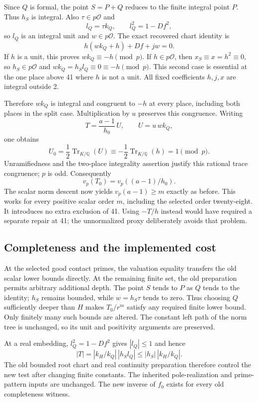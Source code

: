 Since $Q$ is formal, the point $S=P+Q$ reduces to the finite integral
point $P$. Thus $h_S$ is integral. Also $\tau\in p\mathcal O$ and
\[
 l_Q=\tau k_Q,\qquad l_Q^2=1-Df^2,
\]
so $l_Q$ is an integral unit and $w\in p\mathcal O$.
The exact recovered chart identity is
\[
 h(wk_Q+h)+Df+jw=0.                         \tag{*}
\]
If $h$ is a unit, this proves $wk_Q\equiv-h\pmod p$.
If $h\in p\mathcal O$, then $x_S\equiv x=h^2\equiv0$, so
$h_S\in p\mathcal O$ and
$wk_Q=h_Sl_Q\equiv0\equiv-h\pmod p$.
This second case is essential at the one place above 41 where $h$ is
not a unit. All fixed coefficients $h,j,x$ are integral outside 2.

Therefore $wk_Q$ is integral and congruent to $-h$ at every place,
including both places in the split case. Multiplication by $u$ preserves
this congruence. Writing
\[
 T=\frac{a-1}{h_0}\,U,\qquad U=u\,wk_Q,
\]
one obtains
\[
 U_0=\frac12\operatorname{Tr}_{K/\mathbb Q}(U)
       \equiv-\frac12\operatorname{Tr}_{K/\mathbb Q}(h)
       =1\pmod p.
\]
Unramifiedness and the two-place integrality assertion justify this
rational trace congruence; $p$ is odd. Consequently
\[
 \boxed{\ v_p(T_0)=v_p((a-1)/h_0).\ }
\]
The scalar norm descent now yields $v_p(a-1)\ge m$ exactly as before.
This works for every positive scalar order $m$, including the selected
order twenty-eight. It introduces no extra exclusion of 41.
Using $-T/h$ instead would have required a separate repair at 41;
the unnormalized proxy deliberately avoids that problem.

\subsection{Completeness and the implemented cost}

At the selected good contact primes, the valuation equality transfers
the old scalar lower bounds directly. At the remaining finite set, the
old preparation permits arbitrary additional depth. The point $S$ tends
to $P$ as $Q$ tends to the identity; $h_S$ remains bounded, while
$w=h_S\tau$ tends to zero. Thus choosing $Q$ sufficiently deeper than
$H$ makes $T_0/r^m$ satisfy any required finite lower bound. Only finitely
many such bounds are altered. The constant left path of the norm tree
is unchanged, so its unit and positivity arguments are preserved.

At a real embedding, $l_Q^2=1-Df^2$ gives $|l_Q|\le1$ and hence
\[
 |T|=|k_H/k_Q|\,|h_Sl_Q|
       \le |h_S|\,|k_H/k_Q|.
\]
The old bounded root chart and real continuity preparation therefore
control the new test after changing finite constants. The inherited
pole-realization and prime-pattern inputs are unchanged. The new
inverse of $f_0$ exists for every old completeness witness.

